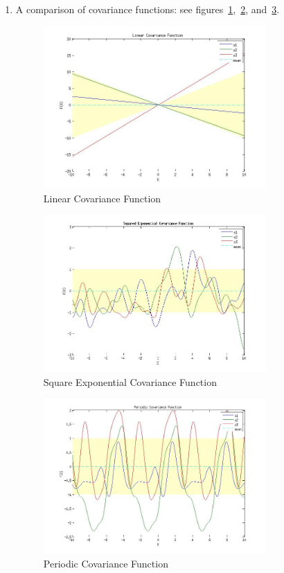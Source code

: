 \documentclass{article}
\begin{document}
\begin{enumerate}[label=(\alph*)]
\item A comparison of covariance functions: see figures~\ref{fig:1a1},~\ref{fig:1a2}, and~\ref{fig:1a3}.
\begin{figure}[H]
\centering
\includegraphics[width=0.8\textwidth]{1_a_1.jpg}
\caption{Linear Covariance Function}
\label{fig:1a1}
\end{figure}
\begin{figure}[H]
\centering
\includegraphics[width=0.8\textwidth]{1_a_2.jpg}
\caption{Square Exponential Covariance Function}
\label{fig:1a2}
\end{figure}
\begin{figure}[H]
\centering
\includegraphics[width=0.8\textwidth]{1_a_3.jpg}
\caption{Periodic Covariance Function}
\label{fig:1a3}
\end{figure}


\end{enumerate}
\end{document}
